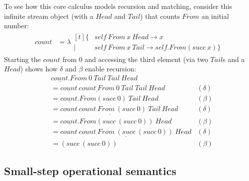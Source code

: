 \documentclass[sigplan,screen]{acmart}
\begin{document}
\begin{example}
\label{ex:count}
  
To see how this core calculus models recursion and matching, consider this
infinite stream object (with a $\mathit{Head}$ and $\mathit{Tail}$) that counts
$\mathit{From}$ an initial number:
\begin{align*}
  \mathit{count} &=
  \lambda
  \begin{aligned}[t]
    \{&
    \mathit{self}~\mathit{From}~x~\mathit{Head} \to x
    \\
    \mid&
    \mathit{self}~\mathit{From}~x~\mathit{Tail} \to \mathit{self}.\mathit{From}(\mathit{succ}~x)
    \}
  \end{aligned}
\end{align*}
Starting the $\mathit{count}$ from 0 and accessing the third element (via two
$\mathit{Tail}$s and a $\mathit{Head}$) shows how $\delta$ and $\beta$ enable
recursion:
\begin{align*}
  &
  \underline{\mathit{count}.}\mathit{From}~0~\mathit{Tail}~\mathit{Tail}~\mathit{Head}
  \\
  &=
  \underline{
    \mathit{count}~\mathit{count}~\mathit{From}~0~\mathit{Tail}
  }
  ~\mathit{Tail}~\mathit{Head}
  &(\delta)
  \\
  &=
  \underline{\mathit{count}.}\mathit{From}(\mathit{succ}~0)~\mathit{Tail}~\mathit{Head}
  &(\beta)
  \\
  &=
  \underline{
    \mathit{count}~\mathit{count}~\mathit{From}~(\mathit{succ}~0)~\mathit{Tail}
  }
  ~\mathit{Head}
  &(\delta)
  \\
  &=
  \underline{\mathit{count}.}\mathit{From}(\mathit{succ}~(\mathit{succ}~0))~\mathit{Head}
  &(\beta)
  \\
  &=
  \underline{
    \mathit{count}~\mathit{count}
    ~\mathit{From}~(\mathit{succ}~(\mathit{succ}~0))
    ~\mathit{Head}
  }
  &(\delta)
  \\
  &=
  (\mathit{succ}~(\mathit{succ}~0))
  &(\beta)
\end{align*}
\end{example}

\subsection{Small-step operational semantics}
\end{document}
